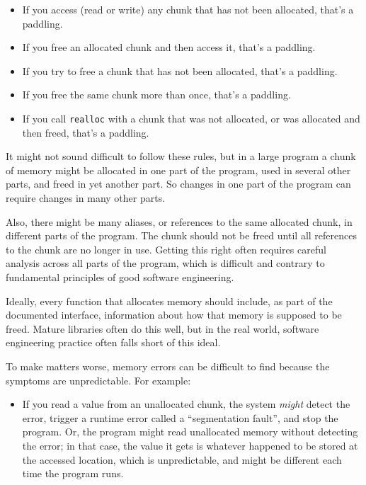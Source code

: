 \documentclass[12pt]{book}
\begin{document}
{\begin{itemize}

\item If you access (read or write) any chunk that has not been
allocated, that's a paddling.

\item If you free an allocated chunk and then access it, that's
a paddling.

\item If you try to free a chunk that has not been allocated,
that's a paddling.

\item If you free the same chunk more than once, that's a paddling.

\item If you call {\tt realloc} with a chunk that was not allocated,
or was allocated and then freed, that's a paddling.

\end{itemize}

It might not sound difficult to follow these rules, but in a large
program a chunk of memory might be allocated in one part of the
program, used in several other parts, and freed in yet another
part.  So changes in one part of the program can require changes
in many other parts.

Also, there might be many aliases, or references to the same allocated
chunk, in different parts of the program.  The chunk should not be
freed until all references to the chunk are no longer in use.  
Getting this right often requires careful analysis across all parts
of the program, which is difficult and contrary to fundamental
principles of good software engineering.

Ideally, every function that allocates memory should include, as part
of the documented interface, information about how that memory is supposed
to be freed.  Mature libraries often do this well, but in the real world,
software engineering practice often falls short of this ideal.

To make matters worse, memory errors can be difficult
to find because the symptoms are unpredictable.  For example:

\begin{itemize}

\item If you read a value from an unallocated chunk, the system {\em might} detect the error, trigger a runtime error called a ``segmentation fault'', and stop the program.  Or, the program might read unallocated memory without detecting the error; in that case, the value it gets is whatever happened to be stored at the accessed location, which is unpredictable, and might be different each time the program runs.


\end{itemize}}
\end{document}

